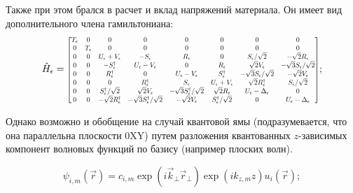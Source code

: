 \documentclass[../main.tex]{subfiles}
\newcommand{\st}{S}
\begin{document}
    Также при этом брался в расчет и вклад напряжений материала. Он имеет вид дополнительного
    члена гамильтониана:
    \begin{equation}
        \hat{H}_\epsilon =
            \rmatrix[0.7]{
                T_\epsilon       &  0 & 0 & 0 & 0 & 0 & 0 & 0\\
                0    &   T_\epsilon   & 0 & 0 & 0 & 0 & 0 & 0\\
                0    & 0  & U_\epsilon + V_\epsilon         & -\st_\epsilon                             & R_\epsilon                                & 0                              & \st_\epsilon / \sqrt{2}           & -\sqrt{2} R_\epsilon\\
                0    & 0  & -\st^\dagger_\epsilon           & U_\epsilon - V_\epsilon                   & 0                                         & R_\epsilon                     & \sqrt{2} V_\epsilon               & -\sqrt{3} \st_\epsilon /\sqrt{2}\\
                0    & 0  & R^\dagger_\epsilon              & 0                                         & U_\epsilon - V_\epsilon                   & \st^\dagger_\epsilon           & - \sqrt{3} \st_\epsilon /\sqrt{2} & - \sqrt{2} V_\epsilon\\
                0    & 0  & 0                               & R^\dagger_\epsilon                        & \st_\epsilon                              & U_\epsilon+V_\epsilon          & \sqrt{2} R_\epsilon^\dagger       & \st_\epsilon/\sqrt{2}\\
                0    & 0  & \st^\dagger_\epsilon /\sqrt{2}  & \sqrt{2} V_\epsilon                       & - \sqrt{3} \st^\dagger_\epsilon /\sqrt{2} & \sqrt{2} R_\epsilon            & U_\epsilon - \Delta_\epsilon      & 0\\
                0    & 0  & - \sqrt{2} R^\dagger_\epsilon   & -\sqrt{3} \st^\dagger_\epsilon /\sqrt{2}  & -\sqrt{2} V_\epsilon                      & \st^\dagger_\epsilon /\sqrt{2} & 0                                 & U_\epsilon - \Delta_\epsilon
            };
    \end{equation} 
    
    Однако возможно и обобщение на случай квантовой ямы (подразумевается, что она параллельна плоскости 0XY)
    путем разложения квантованных $z$-зависимых компонент волновых функций по базису (например плоских волн).
    
    \begin{equation}
        \psi_{i,m}(\vec r) = c_{i, m} \exp(i \vec{k}_\perp \vec{r}_\perp) \exp(i k_{z,m} z) u_i(\vec r);
    \end{equation}
\end{document}
